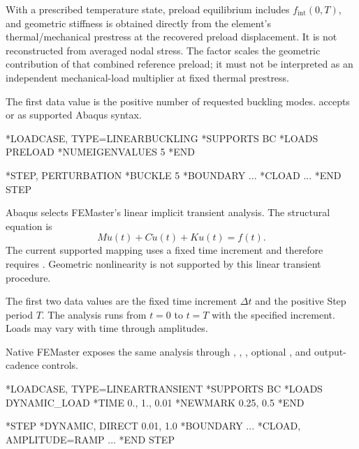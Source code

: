 With a prescribed temperature state, preload equilibrium includes \(f_{\mathrm{int}}(0,T)\), and geometric stiffness is obtained directly from the element's thermal/mechanical prestress at the recovered preload displacement. It is not reconstructed from averaged nodal stress. The factor scales the geometric contribution of that combined reference preload; it must not be interpreted as an independent mechanical-load multiplier at fixed thermal prestress.

The first data value is the positive number of requested buckling modes.  accepts  or  as supported Abaqus syntax.

\exampleheading

\begin{dialectexamples}
\begin{femasterdeck}
*LOADCASE, TYPE=LINEARBUCKLING
*SUPPORTS
BC
*LOADS
PRELOAD
*NUMEIGENVALUES
5
*END
\end{femasterdeck}
\begin{abaqusdeck}
*STEP, PERTURBATION
*BUCKLE
5
*BOUNDARY
...
*CLOAD
...
*END STEP
\end{abaqusdeck}
\end{dialectexamples}


Abaqus  selects FEMaster's linear implicit transient analysis. The structural equation is
\[
M\ddot u(t)+C\dot u(t)+Ku(t)=f(t).
\]
The current supported mapping uses a fixed time increment and therefore requires . Geometric nonlinearity is not supported by this linear transient procedure.

The first two data values are the fixed time increment \(\Delta t\) and the positive Step period \(T\). The analysis runs from \(t=0\) to \(t=T\) with the specified increment. Loads may vary with time through amplitudes.

Native FEMaster exposes the same analysis through , , , optional , and output-cadence controls.

\exampleheading

\begin{dialectexamples}
\begin{femasterdeck}
*LOADCASE, TYPE=LINEARTRANSIENT
*SUPPORTS
BC
*LOADS
DYNAMIC_LOAD
*TIME
0., 1., 0.01
*NEWMARK
0.25, 0.5
*END
\end{femasterdeck}
\begin{abaqusdeck}
*STEP
*DYNAMIC, DIRECT
0.01, 1.0
*BOUNDARY
...
*CLOAD, AMPLITUDE=RAMP
...
*END STEP
\end{abaqusdeck}
\end{dialectexamples}

